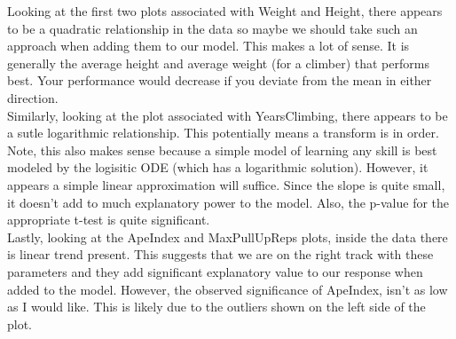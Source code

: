\documentclass[11pt]{amsart}
\begin{document}
Looking at the first two plots associated with Weight and Height, there appears to be a quadratic relationship in the data so maybe we should take such an approach when adding them to our model. This makes a lot of sense. 
It is generally the average height and average weight (for a climber) that performs best.
Your performance would decrease if you deviate from the mean in either direction.\\

Similarly, looking at the plot associated with YearsClimbing, there appears to be a sutle logarithmic relationship.
This potentially means a transform is in order.
Note, this also makes sense because a simple model of learning any skill is best modeled by the logisitic ODE (which has a logarithmic solution). However, it appears a simple linear approximation will suffice. Since the slope is quite small, it doesn't add to much explanatory power to the model. Also, the p-value for the appropriate t-test is quite significant.\\

Lastly, looking at the ApeIndex and MaxPullUpReps plots, inside the data there is linear trend present.
This suggests that we are on the right track with these parameters and they add significant explanatory value to our response when added to the model. However, the observed significance of ApeIndex, isn't as low as I would like. This is likely due to the outliers shown on the left side of the plot.
\end{document}
